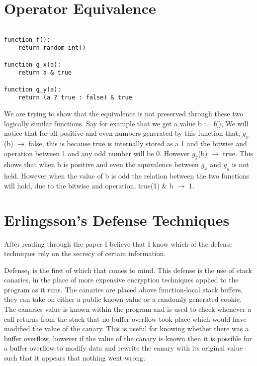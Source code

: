 \documentclass[11pt]{amsart}
\begin{document}
\section{Operator Equivalence}

\begin{verbatim}

function f():
    return random_int()
 
function g_x(a):
    return a & true

function g_y(a):
    return (a ? true : false) & true

\end{verbatim}

We are trying to show that the equivalence is not preserved through these two logically similar functions.  Say for example that we get a value b := f(), We will notice that for all positive and even numbers generated by this function that, $g_x$(b) $\rightarrow$ false, this is because true is internally stored as a 1 and the bitwise and operation between 1 and any odd number will be 0.  However $g_y$(b) $\rightarrow$ true.  This shows that when b is positive and even the equivalence between $g_x$ and $g_y$ is not held.  However when the value of b is odd the relation between the two functions will hold, due to the bitwise and operation, true(1) \& b $\rightarrow$ 1.


\section{Erlingsson's Defense Techniques}

After reading through the paper I believe that I know which of the defense techniques rely on the secrecy of certain information.  

Defense$_1$ is the first of which that comes to mind.  This defense is the use of stack canaries, in the place of more expensive encryption techniques applied to the program as it runs.  The canaries are placed above function-local stack buffers, they can take on either a public known value or a randomly generated cookie.  The canaries value is known within the program and is used to check whenever a call returns from the stack that no buffer overflow took place which would have modified the value of the canary.  This is useful for knowing whether there was a buffer overflow, however if the value of the canary is known then it is possible for a buffer overflow to modify data and rewrite the canary with its original value such that it appears that nothing went wrong.  
\end{document}
